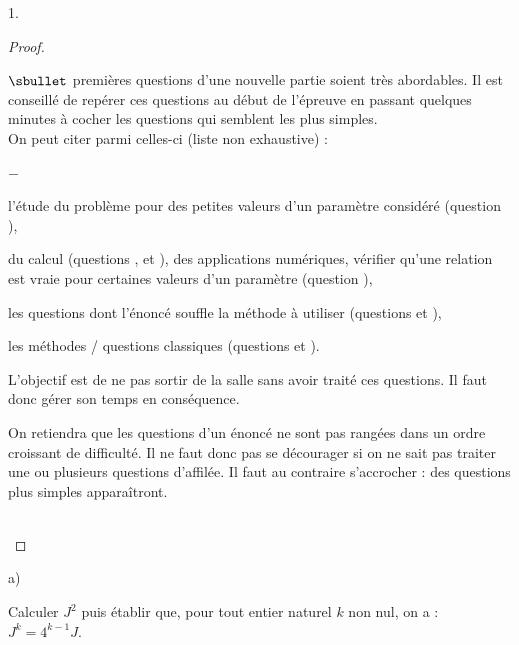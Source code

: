 \begin{noliste}{1.}
\begin{proof}
\begin{remark}
\begin{noliste}{$\sbullet$}
        premières questions d'une nouvelle partie soient très
        abordables. Il est conseillé de repérer ces questions au début
        de l'épreuve en passant quelques minutes à cocher les
        questions qui semblent les plus simples.\\
        On peut citer parmi celles-ci (liste non exhaustive) :
        \begin{noliste}{$-$}
        \item l'étude du problème pour des petites valeurs d'un
          paramètre considéré (question ),
        \item du calcul (questions ,  et
          ), des applications numériques, vérifier qu'une
          relation est vraie pour certaines valeurs d'un paramètre
          (question ),
        \item les questions dont l'énoncé souffle la méthode à
          utiliser (questions  et ),
        \item les méthodes / questions classiques (questions
           et ).
        \end{noliste}
        L'objectif est de ne pas sortir de la salle sans avoir traité
        ces questions. Il faut donc gérer son temps en conséquence.
      \item On retiendra que les questions d'un énoncé ne sont pas
        rangées dans un ordre croissant de difficulté. Il ne faut donc
        pas se décourager si on ne sait pas traiter une ou plusieurs
        questions d'affilée. Il faut au contraire s'accrocher : des
        questions plus simples apparaîtront.
      \end{noliste}
    \end{remark}~\\[-1.2cm]
  \end{proof}

\item
  \begin{noliste}{a)}
    \setlength{\itemsep}{2mm}
  \item Calculer $J^{2}$ puis établir que, pour tout entier naturel
    $k$ non nul, on a : $J^{k} = 4^{k-1} J$.


\end{noliste}
\end{noliste}
